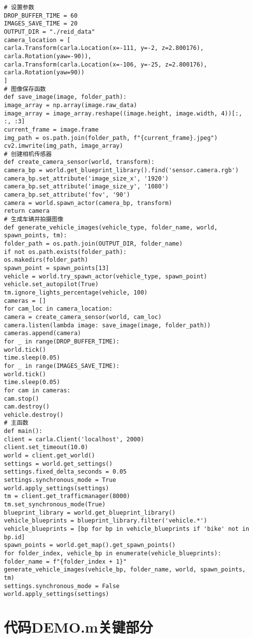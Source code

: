 \begin{lstlisting}
# 设置参数
DROP_BUFFER_TIME = 60
IMAGES_SAVE_TIME = 20
OUTPUT_DIR = "./reid_data"
camera_location = [
carla.Transform(carla.Location(x=-111, y=-2, z=2.800176), carla.Rotation(yaw=-90)),
carla.Transform(carla.Location(x=-106, y=-25, z=2.800176), carla.Rotation(yaw=90))
]
# 图像保存函数
def save_image(image, folder_path):
image_array = np.array(image.raw_data)
image_array = image_array.reshape((image.height, image.width, 4))[:, :, :3]
current_frame = image.frame
img_path = os.path.join(folder_path, f"{current_frame}.jpeg")
cv2.imwrite(img_path, image_array)
# 创建相机传感器
def create_camera_sensor(world, transform):
camera_bp = world.get_blueprint_library().find('sensor.camera.rgb')
camera_bp.set_attribute('image_size_x', '1920')
camera_bp.set_attribute('image_size_y', '1080')
camera_bp.set_attribute('fov', '90')
camera = world.spawn_actor(camera_bp, transform)
return camera
# 生成车辆并拍摄图像
def generate_vehicle_images(vehicle_type, folder_name, world, spawn_points, tm):
folder_path = os.path.join(OUTPUT_DIR, folder_name)
if not os.path.exists(folder_path):
os.makedirs(folder_path)
spawn_point = spawn_points[13]
vehicle = world.try_spawn_actor(vehicle_type, spawn_point)
vehicle.set_autopilot(True)
tm.ignore_lights_percentage(vehicle, 100)
cameras = []
for cam_loc in camera_location:
camera = create_camera_sensor(world, cam_loc)
camera.listen(lambda image: save_image(image, folder_path))
cameras.append(camera)
for _ in range(DROP_BUFFER_TIME):
world.tick()
time.sleep(0.05)
for _ in range(IMAGES_SAVE_TIME):
world.tick()
time.sleep(0.05)
for cam in cameras:
cam.stop()
cam.destroy()
vehicle.destroy()
# 主函数
def main():
client = carla.Client('localhost', 2000)
client.set_timeout(10.0)
world = client.get_world()
settings = world.get_settings()
settings.fixed_delta_seconds = 0.05
settings.synchronous_mode = True
world.apply_settings(settings)
tm = client.get_trafficmanager(8000)
tm.set_synchronous_mode(True)
blueprint_library = world.get_blueprint_library()
vehicle_blueprints = blueprint_library.filter('vehicle.*')
vehicle_blueprints = [bp for bp in vehicle_blueprints if 'bike' not in bp.id]
spawn_points = world.get_map().get_spawn_points()
for folder_index, vehicle_bp in enumerate(vehicle_blueprints):
folder_name = f"{folder_index + 1}"
generate_vehicle_images(vehicle_bp, folder_name, world, spawn_points, tm)
settings.synchronous_mode = False
world.apply_settings(settings)
\end{lstlisting}


\section{代码DEMO.m关键部分}


